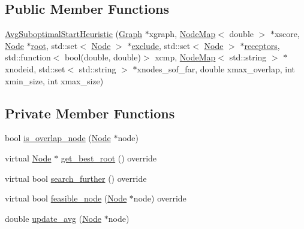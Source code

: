 \subsection*{Public Member Functions}
\begin{DoxyCompactItemize}
\item 
\hyperlink{classderegnet_1_1AvgSuboptimalStartHeuristic_a12082995005a50591bb64951417b2a96}{Avg\+Suboptimal\+Start\+Heuristic} (\hyperlink{namespacederegnet_a55b76c55bbabc682cbc61f8b9948799e}{Graph} $\ast$xgraph, \hyperlink{namespacederegnet_ae102b707ae1d6f83c639ece5e0dd5658}{Node\+Map}$<$ double $>$ $\ast$xscore, \hyperlink{namespacederegnet_a744bad34f2de9856d36715a445f027f3}{Node} $\ast$\hyperlink{classderegnet_1_1DeregnetStartHeuristic_a4605d41352e3adf1f9f9f32466a4e61e}{root}, std\+::set$<$ \hyperlink{namespacederegnet_a744bad34f2de9856d36715a445f027f3}{Node} $>$ $\ast$\hyperlink{classderegnet_1_1DeregnetStartHeuristic_aa22c6581cd404bf7ac325850b28dc951}{exclude}, std\+::set$<$ \hyperlink{namespacederegnet_a744bad34f2de9856d36715a445f027f3}{Node} $>$ $\ast$\hyperlink{classderegnet_1_1DeregnetStartHeuristic_ab80c046ff2b7c64086fceb84987b3e50}{receptors}, std\+::function$<$ bool(double, double)$>$ xcmp, \hyperlink{namespacederegnet_ae102b707ae1d6f83c639ece5e0dd5658}{Node\+Map}$<$ std\+::string $>$ $\ast$xnodeid, std\+::set$<$ std\+::string $>$ $\ast$xnodes\+\_\+sof\+\_\+far, double xmax\+\_\+overlap, int xmin\+\_\+size, int xmax\+\_\+size)
\end{DoxyCompactItemize}
\subsection*{Private Member Functions}
\begin{DoxyCompactItemize}
\item 
bool \hyperlink{classderegnet_1_1AvgSuboptimalStartHeuristic_abc4fa54576da31f3037f2c1aa2cd9140}{is\+\_\+overlap\+\_\+node} (\hyperlink{namespacederegnet_a744bad34f2de9856d36715a445f027f3}{Node} $\ast$node)
\item 
virtual \hyperlink{namespacederegnet_a744bad34f2de9856d36715a445f027f3}{Node} $\ast$ \hyperlink{classderegnet_1_1AvgSuboptimalStartHeuristic_a732194c0c56e6f28839114e3ab119109}{get\+\_\+best\+\_\+root} () override
\item 
virtual bool \hyperlink{classderegnet_1_1AvgSuboptimalStartHeuristic_a668a9db07c0d29c9b3618487f25fe5f4}{search\+\_\+further} () override
\item 
virtual bool \hyperlink{classderegnet_1_1AvgSuboptimalStartHeuristic_aca3dd2ae41b88a0bd925b297d490e2cb}{feasible\+\_\+node} (\hyperlink{namespacederegnet_a744bad34f2de9856d36715a445f027f3}{Node} $\ast$node) override
\item 
double \hyperlink{classderegnet_1_1AvgSuboptimalStartHeuristic_a29659ab4864fddd2c226da7e1ada22ef}{update\+\_\+avg} (\hyperlink{namespacederegnet_a744bad34f2de9856d36715a445f027f3}{Node} $\ast$node)
\end{DoxyCompactItemize}
